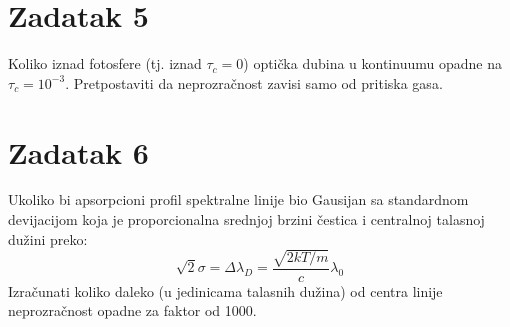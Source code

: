 \documentclass[12pt]{article}
\begin{document}
\section{Zadatak 5}
Koliko iznad fotosfere (tj. iznad $\tau_c=0$) opti\v{c}ka dubina u kontinuumu opadne na $\tau_c = 10^{-3}$. Pretpostaviti da neprozra\v{c}nost zavisi samo od pritiska gasa. 

\section{Zadatak 6}
Ukoliko bi apsorpcioni profil spektralne linije bio Gausijan sa standardnom devijacijom koja je proporcionalna srednjoj brzini \v{c}estica i centralnoj talasnoj du\v{z}ini preko:
\begin{equation}
\sqrt{2} \sigma = \Delta \lambda_D = \frac{\sqrt{2kT/m}}{c} \lambda_0
\end{equation}
Izra\v{c}unati koliko daleko (u jedinicama talasnih du\v{z}ina) od centra linije neprozra\v{c}nost opadne za faktor od 1000.
\end{document}
